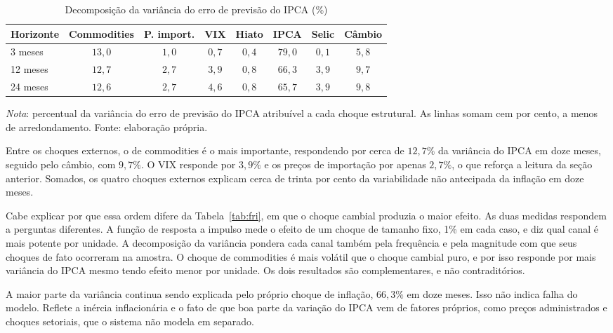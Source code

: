 \documentclass[12pt,openright,oneside,a4paper,portuguese,brazil]{abntex2}
\begin{document}
\begin{table}[htbp]
\centering
\caption{Decomposição da variância do erro de previsão do IPCA (\%)}
\label{tab:fevd}
\footnotesize
\begin{tabular}{lccccccc}
\toprule
Horizonte & Commodities & P. import. & VIX & Hiato & IPCA & Selic & Câmbio \\
\midrule
3 meses  & $13{,}0$ & $1{,}0$ & $0{,}7$ & $0{,}4$ & $79{,}0$ & $0{,}1$ & $5{,}8$ \\
12 meses & $12{,}7$ & $2{,}7$ & $3{,}9$ & $0{,}8$ & $66{,}3$ & $3{,}9$ & $9{,}7$ \\
24 meses & $12{,}6$ & $2{,}7$ & $4{,}6$ & $0{,}8$ & $65{,}7$ & $3{,}9$ & $9{,}8$ \\
\bottomrule
\end{tabular}

\vspace{2pt}
\begin{flushleft}\footnotesize
\textit{Nota}: percentual da variância do erro de previsão do IPCA atribuível a
cada choque estrutural. As linhas somam cem por cento, a menos de
arredondamento. Fonte: elaboração própria.
\end{flushleft}
\end{table}

Entre os choques externos, o de commodities é o mais importante, respondendo por
cerca de $12{,}7\%$ da variância do IPCA em doze meses, seguido pelo câmbio, com
$9{,}7\%$. O VIX responde por $3{,}9\%$ e os preços de importação por apenas
$2{,}7\%$, o que reforça a leitura da seção anterior. Somados, os quatro choques
externos explicam cerca de trinta por cento da variabilidade não antecipada da
inflação em doze meses.

Cabe explicar por que essa ordem difere da Tabela~\ref{tab:fri}, em que o
choque cambial produzia o maior efeito. As duas medidas respondem a perguntas
diferentes. A função de resposta a impulso mede o efeito de um choque de tamanho
fixo, 1\% em cada caso, e diz qual canal é mais potente por unidade. A
decomposição da variância pondera cada canal também pela frequência e pela
magnitude com que seus choques de fato ocorreram na amostra. O choque de
commodities é mais volátil que o choque cambial puro, e por isso responde por
mais variância do IPCA mesmo tendo efeito menor por unidade. Os dois resultados
são complementares, e não contraditórios.

A maior parte da variância continua sendo explicada pelo próprio choque de
inflação, $66{,}3\%$ em doze meses. Isso não indica falha do modelo. Reflete a inércia inflacionária e o fato de
que boa parte da variação do IPCA vem de fatores próprios, como preços
administrados e choques setoriais, que o sistema não modela em separado.
\end{document}
